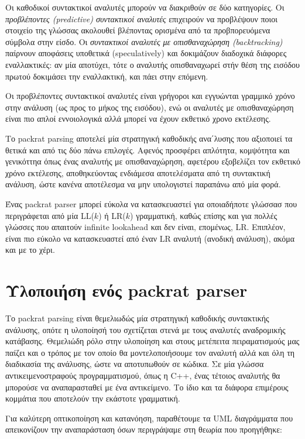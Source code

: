 \documentclass[diploma]{softlab-thesis}
\begin{document}
Οι καθοδικοί συντακτικοί αναλυτές μπορούν να διακριθούν σε δύο κατηγορίες. Οι \textit{προβλέποντες (predictive) συντακτικοί αναλυτές} επιχειρούν να προβλέψουν ποιοι στοιχείο της γλώσσας ακολουθεί βλέποντας ορισμένα από τα προβπορευόμενα σύμβολα στην είσδο.
Οι \textit{συντακτικοί αναλυτές με οπισθαναχώρηση (backtracking)} παίρνουν αποφάσεις υποθετικά (speculatively) και δοκιμάζουν διαδοχικά διάφορες εναλλακτικές: αν μία αποτύχει, τότε ο αναλυτής οπισθαναχωρεί στήν θέση της εισόδου πρωτού δοκιμάσει την εναλλακτική, και πάει στην επόμενη. 

Οι προβλέποντες συντακτικοί αναλυτές είναι γρήγοροι και εγγυώνται γραμμικό χρόνο στην ανάλυση (ως προς το μήκος της εισόδου), ενώ οι αναλυτές με οπισθαναχώρηση είναι πιο απλοί εννοιολογικά αλλά μπορεί να έχουν εκθετικό χρονο εκτέλεσης.

Το packrat parsing αποτελεί μία στρατηγική καθοδικής ανα΄λυσης που αξιοποιεί τα θετικά και από τις δύο πάνω επιλογές. 
Αφενός προσφέρει απλότητα, κομψότητα και γενικόττηα όπως ένας αναλυτής με οπισθαναχώρηση, αφετέρου εξοβελίζει τον εκθετικό χρόνο εκτέλεσης, αποθηκεύοντας ενδιάμεσα αποτελέσματα από τη συντακτική ανάλυση, ώστε κανένα αποτέλεσμα να μην υπολογιστεί παραπάνω από μία φορά.

Ένας packrat parser μπορεί εύκολα να κατασκευαστεί για οποιαδήποτε γλώσσασ που περιγράφεται από μία LL($k$) ή LR($k$) γραμματική, καθώς επίσης και για πολλές γλώσσες που απαιτούν infinite lookahead και δεν είναι, επομένως, LR.
Επιπλέον, είναι πιο εύκολο να κατασκευαστεί από έναν LR αναλυτή (ανοδική ανάλυση), ακόμα και με το χέρι.

\section{Υλοποιήση ενός packrat parser}

Το packrat parsing είναι θεμελιωδώς μία στρατηγική καθοδικής συντακτικής ανάλυσης, οπότε η υλοποίησή του σχετίζεται στενά με τους αναλυτές αναδρομικής κατάβασης. 
Θεμελιώδη ρόλο στην υλοποίηση και στους μετέπειτα πειραματισμούς μας παίζει και ο τρόπος με τον οποίο θα μοντελοποιήσουμε τον αναλυτή αλλά και όλη τη διαδικασία της ανάλυσης, ώστε να αποτυπωθούν σε κώδικα. 
Σε μία γλώσσα αντικειμενοστραφούς προγραμματισμού, όπως η C++, ένας τέτοιος αναλυτής θα μπορούσε να αναπαρασταθεί με ένα αντικείμενο. Το ίδιο και τα διάφορα επιμέρους κομμάτια που αποτελούν την εκάστοτε γραμματική. 

Για καλύτερη οπτικοποίηση και κατανόηση, παραθέτουμε τα UML διαγράμματα που απεικονίζουν την αναπαράσταση όσων περιγράψαμε στη θεωρία που προηγήθηκε:
\end{document}

